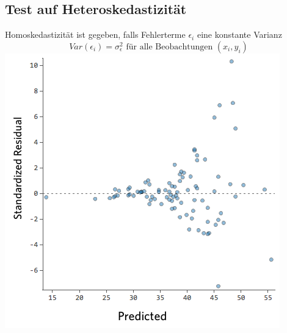 \documentclass[10pt]{report}
\theoremstyle{definition}
\begin{document}
\subsection{Test auf Heteroskedastizität}
Homoskedastizität ist gegeben, falls Fehlerterme $\epsilon_i$ eine konstante Varianz
\[ Var(\epsilon_i) = \sigma_{\epsilon}^{2} \text{ für alle  Beobachtungen } (x_i, y_i) \] 
\includegraphics[scale=0.5]{VorlesungenTexDateien/images/Heteroscadicity}
\end{document}
